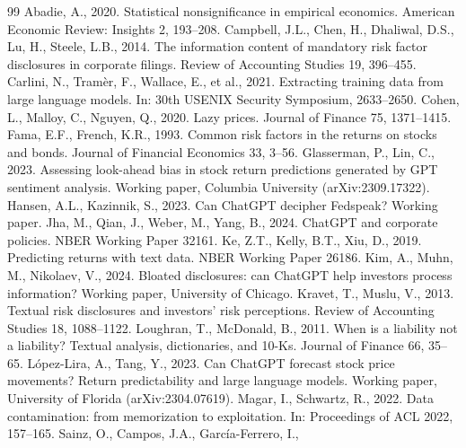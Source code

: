\documentclass[12pt]{article}
\begin{document}
\begin{thebibliography}{99}
 Abadie, A., 2020. Statistical nonsignificance in empirical
economics. American Economic Review: Insights 2, 193--208.
 Campbell, J.L., Chen, H., Dhaliwal, D.S.,
Lu, H., Steele, L.B., 2014. The information content of mandatory risk factor disclosures in
corporate filings. Review of Accounting Studies 19, 396--455.
 Carlini, N., Tramèr, F., Wallace, E., et al.,
2021. Extracting training data from large language models. In: 30th USENIX Security
Symposium, 2633--2650.
 Cohen, L., Malloy, C., Nguyen, Q., 2020.
Lazy prices. Journal of Finance 75, 1371--1415.
 Fama, E.F., French, K.R., 1993. Common risk factors
in the returns on stocks and bonds. Journal of Financial Economics 33, 3--56.
 Glasserman, P., Lin, C., 2023.
Assessing look-ahead bias in stock return predictions generated by GPT sentiment analysis.
Working paper, Columbia University (arXiv:2309.17322).
 Hansen, A.L., Kazinnik, S., 2023.
Can ChatGPT decipher Fedspeak? Working paper.
 Jha, M., Qian, J., Weber, M., Yang, B., 2024.
ChatGPT and corporate policies. NBER Working Paper 32161.
 Ke, Z.T., Kelly, B.T., Xiu, D., 2019. Predicting returns
with text data. NBER Working Paper 26186.
 Kim, A., Muhn, M., Nikolaev, V., 2024. Bloated
disclosures: can ChatGPT help investors process information? Working paper, University of
Chicago.
 Kravet, T., Muslu, V., 2013. Textual risk
disclosures and investors' risk perceptions. Review of Accounting Studies 18, 1088--1122.
 Loughran, T., McDonald, B., 2011.
When is a liability not a liability? Textual analysis, dictionaries, and 10-Ks. Journal of
Finance 66, 35--65.
 López-Lira, A., Tang, Y., 2023.
Can ChatGPT forecast stock price movements? Return predictability and large language models.
Working paper, University of Florida (arXiv:2304.07619).
 Magar, I., Schwartz, R., 2022. Data
contamination: from memorization to exploitation. In: Proceedings of ACL 2022, 157--165.
 Sainz, O., Campos, J.A., García-Ferrero, I.,

\end{thebibliography}
\end{document}
